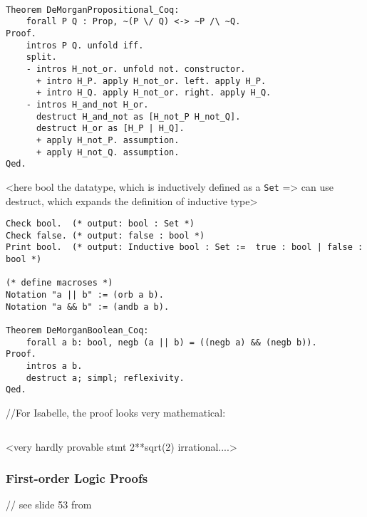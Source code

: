 \documentclass[article]{aaltoseries}
\begin{document}
\begin{lstlisting}[language=coq,caption={Proof of propositional logic tautology in Coq: the de Morgan's law for propositions},label={DeMorganPropositional_Coq}]

Theorem DeMorganPropositional_Coq:
    forall P Q : Prop, ~(P \/ Q) <-> ~P /\ ~Q.
Proof.
    intros P Q. unfold iff.
    split.
    - intros H_not_or. unfold not. constructor.
      + intro H_P. apply H_not_or. left. apply H_P.
      + intro H_Q. apply H_not_or. right. apply H_Q.
    - intros H_and_not H_or.
      destruct H_and_not as [H_not_P H_not_Q].
      destruct H_or as [H_P | H_Q].
      + apply H_not_P. assumption.
      + apply H_not_Q. assumption.
Qed.
\end{lstlisting}


<here bool the datatype, which is inductively defined as a \texttt{Set} => can use destruct, which expands the definition of inductive type>
\begin{lstlisting}[language=coq,caption={Propositional logic proof: de Morgan's law for booleans},label={Coq:DeMorgan_bool}]
Check bool.  (* output: bool : Set *)
Check false. (* output: false : bool *)
Print bool.  (* output: Inductive bool : Set :=  true : bool | false : bool *)

(* define macroses *)
Notation "a || b" := (orb a b).
Notation "a && b" := (andb a b).

Theorem DeMorganBoolean_Coq:
    forall a b: bool, negb (a || b) = ((negb a) && (negb b)).
Proof.
    intros a b.
    destruct a; simpl; reflexivity.
Qed.
\end{lstlisting}


//For Isabelle, the proof looks very mathematical:
\begin{lstlisting}

\end{lstlisting}



<very hardly provable stmt 2**sqrt(2) irrational....>



\subsubsection{First-order Logic Proofs}

// see slide 53 from %
\end{document}
